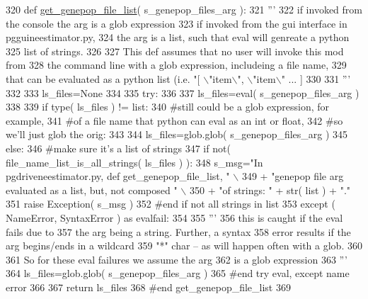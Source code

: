 \begin{DoxyCode}
320 \textcolor{keyword}{def }\hyperlink{namespacenegui_1_1pgdriveneestimator_a15b09d2967ec4812353b0e146f074799}{get\_genepop\_file\_list}( s\_genepop\_files\_arg ):
321     \textcolor{stringliteral}{'''}
322 \textcolor{stringliteral}{    if invoked from the console the arg is a glob expression}
323 \textcolor{stringliteral}{    if invoked from the gui interface in pgguineestimator.py,}
324 \textcolor{stringliteral}{    the arg is a list, such that eval will genreate a python}
325 \textcolor{stringliteral}{    list of strings.}
326 \textcolor{stringliteral}{}
327 \textcolor{stringliteral}{    This def assumes that no user will invoke this mod from }
328 \textcolor{stringliteral}{    the command line with a glob expression, includeing a file name,}
329 \textcolor{stringliteral}{    that can be evaluated as a python list (i.e. "[ \(\backslash\)"item\(\backslash\)", \(\backslash\)"item\(\backslash\)" ... ]}
330 \textcolor{stringliteral}{    }
331 \textcolor{stringliteral}{    '''}
332 
333     ls\_files=\textcolor{keywordtype}{None}
334 
335     \textcolor{keywordflow}{try}:
336 
337         ls\_files=eval( s\_genepop\_files\_arg )
338 
339         \textcolor{keywordflow}{if} type( ls\_files ) != list:
340             \textcolor{comment}{#still could be a glob expression, for example,}
341             \textcolor{comment}{#of a file name that python can eval as an int or float,}
342             \textcolor{comment}{#so we'll just glob the orig:}
343 
344             ls\_files=glob.glob( s\_genepop\_files\_arg )
345         \textcolor{keywordflow}{else}:
346             \textcolor{comment}{#make sure it's a list of strings}
347             \textcolor{keywordflow}{if} not( file\_name\_list\_is\_all\_strings( ls\_files ) ):
348                 s\_msg=\textcolor{stringliteral}{"In pgdriveneestimator.py, def get\_genepop\_file\_list, "} \(\backslash\)
349                         + \textcolor{stringliteral}{"genepop file arg evaluated as a list, but, not composed "} \(\backslash\)
350                         + \textcolor{stringliteral}{"of strings: "} + str( list ) + \textcolor{stringliteral}{"."}
351                 \textcolor{keywordflow}{raise} Exception( s\_msg )
352             \textcolor{comment}{#end if not all strings in list}
353     \textcolor{keywordflow}{except} ( NameError, SyntaxError ) \textcolor{keyword}{as} evalfail:
354 
355         \textcolor{stringliteral}{'''}
356 \textcolor{stringliteral}{        this is caught if the eval fails due to }
357 \textcolor{stringliteral}{        the arg being a string.  Further, a syntax}
358 \textcolor{stringliteral}{        error results if the arg begins/ends in a wildcard}
359 \textcolor{stringliteral}{        "*" char -- as will happen often with a glob.}
360 \textcolor{stringliteral}{}
361 \textcolor{stringliteral}{        So for these eval failures we assume the arg }
362 \textcolor{stringliteral}{        is a glob expression}
363 \textcolor{stringliteral}{        '''}
364         ls\_files=glob.glob( s\_genepop\_files\_arg )
365     \textcolor{comment}{#end try eval, except name error}
366 
367     \textcolor{keywordflow}{return} ls\_files
368 \textcolor{comment}{#end get\_genepop\_file\_list}
369 
\end{DoxyCode}
